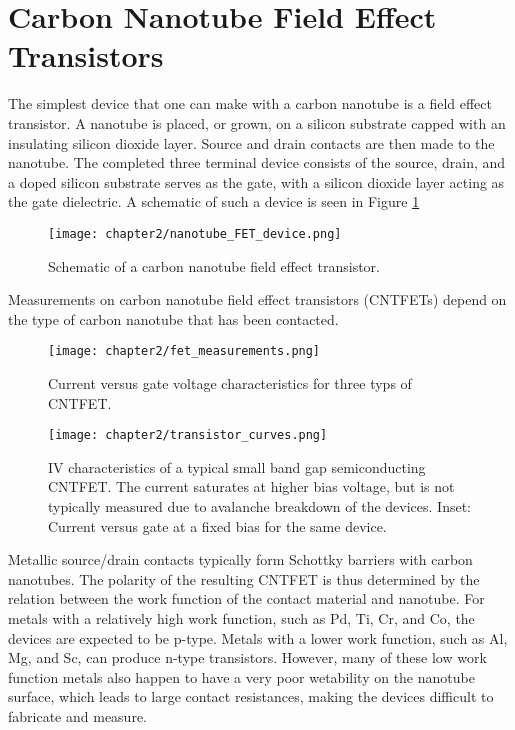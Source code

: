\section{Carbon Nanotube Field Effect Transistors}

The simplest device that one can make with a carbon nanotube is a field effect transistor. A nanotube is placed, or grown, on a silicon substrate capped with an insulating silicon dioxide layer. Source and drain contacts are then made to the nanotube. The completed three terminal device consists of the source, drain, and a doped silicon substrate serves as the gate, with a silicon dioxide layer acting as the gate dielectric. A schematic of such a device is seen in Figure \ref{fig:nanotube_fet}

\begin{figure}
    \centering
    \texttt{[image: chapter2/nanotube\_FET\_device.png]}
    \caption{Schematic of a carbon nanotube field effect transistor.}
    \label{fig:nanotube_fet}
\end{figure}

Measurements on carbon nanotube field effect transistors (CNTFETs) depend on the type of carbon nanotube that has been contacted.

\begin{figure}
    \centering
    \texttt{[image: chapter2/fet\_measurements.png]}
    \caption{Current versus gate voltage characteristics for three typs of CNTFET.}
    \label{fig:fet_measurements}
\end{figure}

\begin{figure}
    \centering
    \texttt{[image: chapter2/transistor\_curves.png]}
    \caption{IV characteristics of a typical small band gap semiconducting CNTFET. The current saturates at higher bias voltage, but is not typically measured due to avalanche breakdown of the devices. Inset: Current versus gate at a fixed bias for the same device.}
    \label{transistor_curves.png}
\end{figure}

Metallic source/drain contacts typically form Schottky barriers with carbon nanotubes. The polarity of the resulting CNTFET is thus determined by the relation between the work function of the contact material and nanotube. For metals with a relatively high work function, such as Pd, Ti, Cr, and Co, the devices are expected to be p-type. Metals with a lower work function, such as Al, Mg, and Sc, can produce n-type transistors. However, many of these low work function metals also happen to have a very poor wetability on the nanotube surface, which leads to large contact resistances, making the devices difficult to fabricate and measure.

